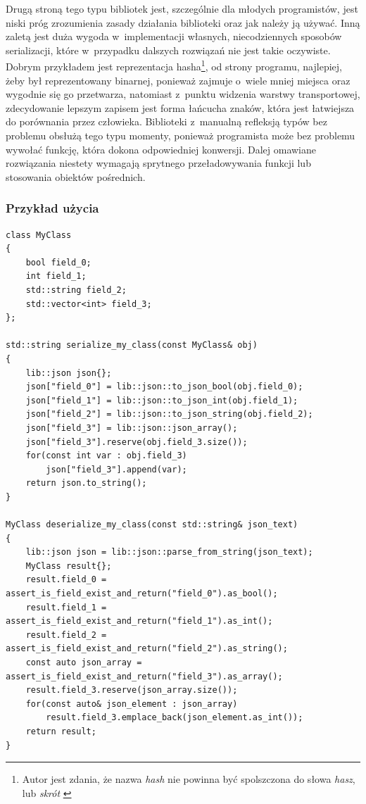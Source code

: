 \documentclass[12pt]{article}
\newcommand{\nonpl}[1]{{\it #1}}
\begin{document}
{{{				Drugą stroną tego typu bibliotek jest, szczególnie dla młodych programistów, jest niski próg zrozumienia zasady działania
				biblioteki oraz jak należy ją używać. Inną zaletą jest duża wygoda w~implementacji własnych, niecodziennych sposobów serializacji,
				które w~przypadku dalszych rozwiązań nie jest takie oczywiste. Dobrym przykładem jest reprezentacja hasha\footnote{
					Autor jest zdania, że nazwa \nonpl{hash} nie powinna być spolszczona do słowa \nonpl{hasz}, lub \nonpl{skrót} \cite{hash_po_angielskiemu}
				}, od strony programu, najlepiej, żeby był reprezentowany binarnej, ponieważ zajmuje o~wiele mniej miejsca oraz wygodnie się go przetwarza,
				natomiast z~punktu widzenia warstwy transportowej, zdecydowanie lepszym zapisem jest forma łańcucha znaków, która jest łatwiejsza do porównania
				przez człowieka. Biblioteki z~manualną refleksją typów bez problemu obsłużą tego typu momenty, ponieważ programista może bez problemu
				wywołać funkcję, która dokona odpowiedniej konwersji. Dalej omawiane rozwiązania niestety wymagają sprytnego przeładowywania funkcji lub
				stosowania obiektów pośrednich.
			}

			{
				\subsubsection{Przykład użycia}

				\begin{lstlisting}[frame=single]
class MyClass
{
	bool field_0;
	int field_1;
	std::string field_2;
	std::vector<int> field_3;
};

std::string serialize_my_class(const MyClass& obj)
{
	lib::json json{};
	json["field_0"] = lib::json::to_json_bool(obj.field_0);
	json["field_1"] = lib::json::to_json_int(obj.field_1);
	json["field_2"] = lib::json::to_json_string(obj.field_2);
	json["field_3"] = lib::json::json_array();
	json["field_3"].reserve(obj.field_3.size());
	for(const int var : obj.field_3)
		json["field_3"].append(var);
	return json.to_string();
}

MyClass deserialize_my_class(const std::string& json_text)
{
	lib::json json = lib::json::parse_from_string(json_text);
	MyClass result{};
	result.field_0 = assert_is_field_exist_and_return("field_0").as_bool();
	result.field_1 = assert_is_field_exist_and_return("field_1").as_int();
	result.field_2 = assert_is_field_exist_and_return("field_2").as_string();
	const auto json_array = assert_is_field_exist_and_return("field_3").as_array();
	result.field_3.reserve(json_array.size());
	for(const auto& json_element : json_array)
		result.field_3.emplace_back(json_element.as_int());
	return result;
}
				\end{lstlisting}
			}
		}

}
\end{document}
